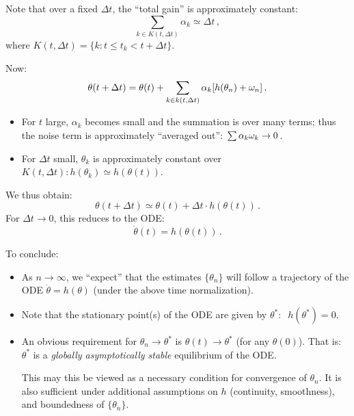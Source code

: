 \begin{center}
\end{center}


Note that over a fixed $\Delta t$, the ``total gain'' is approximately
constant:
$$
\sum_{k\in K(t, \Delta t)} \alpha_k \simeq \Delta t\,,
$$
where $K(t,\Delta t) = \{k: t \le t_k < t+ \Delta t\}$.

Now:
$$
\theta(t+\Delta t) = \theta(t) + \sum_{k\in k(t, \Delta t)} \alpha_k [h(\theta_n)
+\omega_n] \,.
$$
\begin{itemize}
\item
For $t$ large, $\alpha_k$ becomes small and the summation is over many
terms; thus the noise term is approximately ``averaged out'':
$\sum \alpha_k \omega_k \to 0$.
\item
For $\Delta t$ small, $\theta_k$ is approximately constant over $K(t, \Delta t):
h(\theta_k) \simeq h(\theta(t))$.
\end{itemize}
We thus obtain:
$$
\theta(t+\Delta t) \simeq \theta(t) +\Delta t\cdot h (\theta(t))\,.
$$
For $\Delta t \to 0$, this reduces to the ODE:
$$
\dot \theta(t) = h(\theta(t))\,.
$$

\medskip

To conclude:
\begin{itemize}
\item
As $n\to\infty$, we ``expect'' that the estimates
$\{\theta_n\}$ will follow a trajectory of the ODE $\dot\theta=h(\theta)$
(under the above time normalization).
\item
Note that the stationary point(s) of the ODE are given by
$\theta^*:\;\; h(\theta^*) = 0$.
\item
An obvious requirement for $\theta_n \to \theta^*$ is
$\theta(t) \to \theta^*$
(for any $\theta(0)$).
That is: $\theta^*$ is a {\em globally asymptotically stable} equilibrium of
the ODE.

This may this be viewed as a necessary condition for convergence of
$\theta_n$. It is also sufficient under additional assumptions on
$h$ (continuity, smoothness), and boundedness of $\{\theta_n\}$.
\end{itemize}

